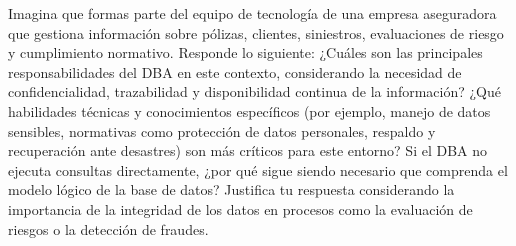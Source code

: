 \item Imagina que formas parte del equipo de tecnología de una empresa aseguradora que gestiona información sobre pólizas, clientes, siniestros, evaluaciones de riesgo y cumplimiento normativo. Responde lo siguiente: ¿Cuáles son las principales responsabilidades del DBA en este contexto, considerando la necesidad de confidencialidad, trazabilidad y disponibilidad continua de la información? ¿Qué habilidades técnicas y conocimientos específicos (por ejemplo, manejo de datos sensibles, normativas como protección de datos personales, respaldo y recuperación ante desastres) son más críticos para este entorno? Si el DBA no ejecuta consultas directamente, ¿por qué sigue siendo necesario que comprenda el modelo lógico de la base de datos? Justifica tu respuesta considerando la importancia de la integridad de los datos en procesos como la evaluación de riesgos o la detección de fraudes.

